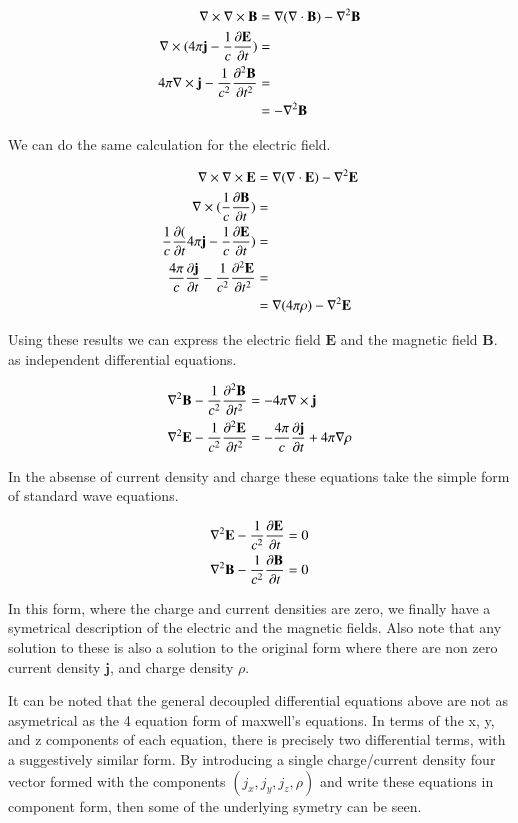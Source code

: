 \documentclass{article}      %
\newcommand{\grad}[1]{\nabla#1}
\newcommand{\curl}[1]{\nabla \times #1}
\newcommand{\Curl}[1]{\nabla \times \mathbf{#1}}
\newcommand{\Diverg}[1]{\nabla \cdot \mathbf{#1}}
\newcommand{\curlCurl}[1]{\curl\Curl{#1}}
\newcommand{\Delsquared}[1]{{\nabla^2}{\mathbf{#1}}}
\newcommand{\ddt}[1]{ {{\partial{#1}} \over {\partial{t}}}}
\newcommand{\Ddt}[1]{ {{\partial{\mathbf{#1}}} \over {\partial{t}}}}
\newcommand{\Ddts}[1]{ {{\partial^2{\mathbf{#1}}} \over {\partial{t}^2}}}
\newcommand{\Bj}[0]{\mathbf{j}}
\newcommand{\BB}[0]{\mathbf{B}}
\newcommand{\BE}[0]{\mathbf{E}}
\begin{document}
\begin{align*}
\curlCurl{B} &= \grad (\Diverg{B}) - \Delsquared{B} \\
\curl(4\pi\Bj - {1 \over c} \Ddt{E}) &= \\
4\pi \Curl{j} - {1 \over c^2} \Ddts{B} &= \\
      	     &= 		   - \Delsquared{B}
\end{align*}

We can do the same calculation for the electric field.

\begin{align*}
\curlCurl{E} &= \grad (\Diverg{E}) - \Delsquared{E} \\
\curl({1 \over c} \Ddt{B}) &= \\
{1 \over c} \ddt(4\pi \Bj - {1 \over c} \Ddt{E}) &= \\
{4\pi \over c} \Ddt{j} - {1 \over c^2} \Ddts{E} &= \\
             &= \grad (4\pi\rho) - \Delsquared{E} \\
\end{align*}

Using these results we can express the 
electric field $\BE$ and the
magnetic field $\BB$.
as independent differential equations.

\begin{align*}
\Delsquared{B} - {1 \over c^2} \Ddts{B} &= - 4\pi \Curl{j} \\
\Delsquared{E} - {1 \over c^2} \Ddts{E} &= - {4\pi \over c} \Ddt{j} + 4\pi \grad{\rho}
\end{align*}

In the absense of current density and charge these equations take the simple form of standard wave
equations.

\begin{align*}
\Delsquared{E} - {1 \over c^2} \Ddt{E} &= 0 \\
\Delsquared{B} - {1 \over c^2} \Ddt{B} &= 0
\end{align*}

In this form, where the charge and current densities are zero, we finally have 
a symetrical description of the electric and the magnetic fields.  Also note 
that any solution to these is also a solution to the original form where 
there are non zero current density $\Bj$, and charge density $\rho$.

It can 
be noted that the general decoupled differential equations above are not 
as asymetrical as the 4 equation form of maxwell's equations.  In terms of the x, y, and z components 
of each equation, there is precisely two differential terms, with a suggestively 
similar form.
By introducing a 
single charge/current density four vector formed with the components 
$(j_x, j_y, j_z, \rho)$ and write these equations in component 
form, 
then some of the underlying symetry can be seen.
\end{document}
